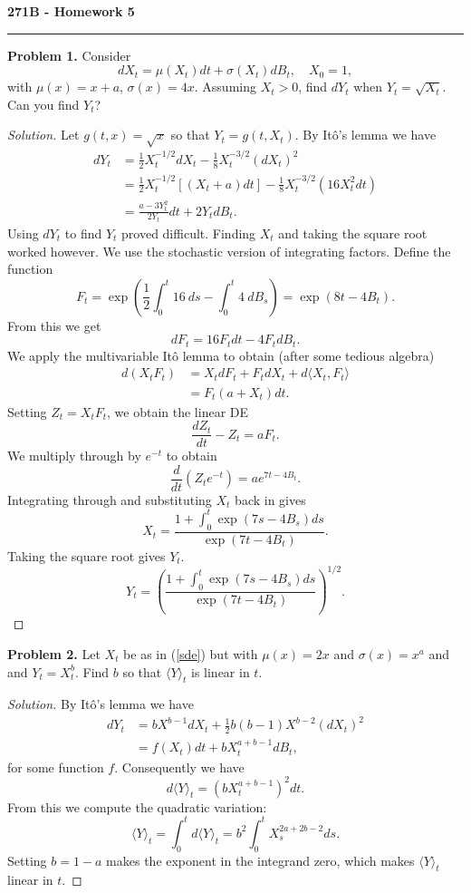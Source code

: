 \documentclass[11pt,letterpaper]{report}
\newenvironment{solution}
{\begin{proof}[Solution]}
{\end{proof}}
\begin{document}
\begin{center}
{\bf \Large 271B - Homework 5}
\vspace{0.2cm}
\hrule
\end{center}

\noindent\textbf{Problem 1. }
Consider
\begin{equation}\label{sde}
dX_t = \mu(X_t)dt + \sigma(X_t)dB_t,\quad X_0 = 1,
\end{equation}
with $\mu(x) = x+a$, $\sigma(x) = 4x$. Assuming $X_t > 0$, find $dY_t$ when $Y_t = \sqrt{X_t}$. Can you find $Y_t$?
\begin{solution}
	Let $g(t, x) = \sqrt{x}$ so that $Y_t = g(t, X_t)$. By It\^o's lemma we have
	\begin{align*}
		dY_t &= \frac{1}{2}X_t^{-1/2}dX_t - \frac{1}{8}X_{t}^{-3/2}(dX_t)^2\\
		&= \frac{1}{2}X_t^{-1/2}[(X_t+a)dt] - \frac{1}{8}X_t^{-3/2}(16X_t^2dt)\\
		&= \frac{a-3Y_t^2}{2Y_t}dt + 2Y_tdB_t.
	\end{align*}
	Using $dY_t$ to find $Y_t$ proved difficult. Finding $X_t$ and taking the square root worked however. We use the stochastic version of integrating factors. Define the function
	\[
	F_t = \exp\left(\frac{1}{2}\int_0^t16\ ds -\int_0^t4\ dB_s \right) = \exp(8t - 4B_t).
	\]
	From this we get
	\[
	dF_t = 16F_tdt - 4F_tdB_t.
	\]
	We apply the multivariable It\^o lemma to obtain (after some tedious algebra)
	\begin{align*}
	d(X_tF_t) &= X_tdF_t + F_tdX_t + d\langle X_t, F_t\rangle\\
	&= F_t(a+X_t)dt.
	\end{align*}
	Setting $Z_t = X_tF_t$, we obtain the linear DE
	\[
	\frac{dZ_t}{dt}-Z_t = aF_t.
	\]
	We multiply through by $e^{-t}$ to obtain
	\[
	\frac{d}{dt}(Z_te^{-t}) = ae^{7t-4B_t}.
	\]
	Integrating through and substituting $X_t$ back in gives
	\[
	X_t = \frac{1 + \int_0^t\exp(7s-4B_s)ds}{\exp(7t-4B_t)}.
	\]
	Taking the square root gives $Y_t$.
	\[
	Y_t = \left(\frac{1 + \int_0^t\exp(7s-4B_s)ds}{\exp(7t-4B_t)} \right)^{1/2}.
	\]
\end{solution}

\noindent\textbf{Problem 2. }
Let $X_t$ be as in (\ref{sde}) but with $\mu(x) = 2x$ and $\sigma(x) = x^a$ and and $Y_t = X_t^b$. Find $b$ so that $\langle Y\rangle_t$ is linear in $t$.
\begin{solution}
	By It\^o's lemma we have
	\begin{align*}
		dY_t &= bX^{b-1}dX_t + \frac{1}{2}b(b-1)X^{b-2}(dX_t)^2\\
		&= f(X_t)dt + bX_t^{a+b-1}dB_t,
	\end{align*}
	for some function $f$. Consequently we have
	\[
	d\langle Y\rangle_t = (bX_t^{a+b-1})^2dt.
	\]
	From this we compute the quadratic variation:
	\[
	\langle Y\rangle_t = \int_0^td\langle Y\rangle_t = b^2\int_0^tX_s^{2a+2b-2}ds.
	\]
	Setting $b = 1-a$ makes the exponent in the integrand zero, which makes $\langle Y\rangle_t$ linear in $t$.
\end{solution}
\end{document}
